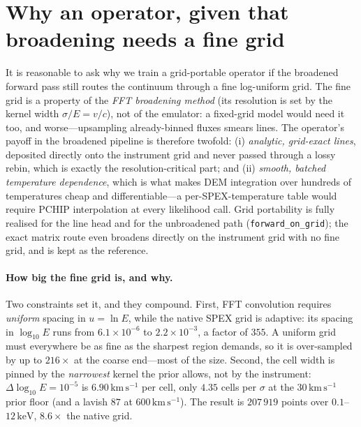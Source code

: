 \documentclass[11pt,a4paper]{article}
\newcommand{\kev}{\,\mathrm{keV}}
\newcommand{\kms}{\,\mathrm{km\,s^{-1}}}
\newcommand{\code}[1]{\texttt{#1}}
\begin{document}
\section{Why an operator, given that broadening needs a fine grid}
It is reasonable to ask why we train a grid-portable operator if the broadened
forward pass still routes the continuum through a fine log-uniform grid. The
fine grid is a property of the \emph{FFT broadening method} (its resolution is
set by the kernel width $\sigma/E=v/c$), not of the emulator: a fixed-grid model
would need it too, and worse---upsampling already-binned fluxes smears lines.
The operator's payoff in the broadened pipeline is therefore twofold: (i)
\emph{analytic, grid-exact lines}, deposited directly onto the instrument grid
and never passed through a lossy rebin, which is exactly the
resolution-critical part; and (ii) \emph{smooth, batched temperature
dependence}, which is what makes DEM integration over hundreds of temperatures
cheap and differentiable---a per-SPEX-temperature table would require PCHIP
interpolation at every likelihood call. Grid portability is fully realised for
the line head and for the unbroadened path (\code{forward\_on\_grid}); the exact
matrix route even broadens directly on the instrument grid with no fine grid,
and is kept as the reference.

\paragraph{How big the fine grid is, and why.} Two constraints set it, and they
compound. First, FFT convolution requires \emph{uniform} spacing in $u=\ln E$,
while the native SPEX grid is adaptive: its spacing in $\log_{10}E$ runs from
$6.1\times10^{-6}$ to $2.2\times10^{-3}$, a factor of $355$. A uniform grid must
everywhere be as fine as the sharpest region demands, so it is over-sampled by
up to $216\times$ at the coarse end---most of the size. Second, the cell width
is pinned by the \emph{narrowest} kernel the prior allows, not by the
instrument: $\Delta\log_{10}E=10^{-5}$ is $6.90\kms$ per cell, only $4.35$ cells
per $\sigma$ at the $30\kms$ prior floor (and a lavish $87$ at $600\kms$). The
result is $207\,919$ points over $0.1$--$12\kev$, $8.6\times$ the native grid.
\end{document}
